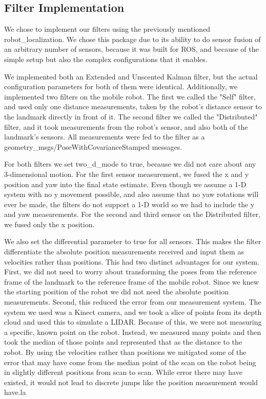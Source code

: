 \documentclass[conference]{IEEEtran}
\begin{document}
\subsection{Filter Implementation}
We chose to implement our filters using the previously mentioned robot\_localization. We chose this package due to its 
ability to do sensor fusion of an arbitrary number of sensors, because it was built for ROS, and because of the simple 
setup but also the complex configurations that it enables.

We implemented both an Extended and Unscented Kalman filter, but the actual configuration parameters for both of them 
were identical. Additionally, we implemented two filters on the mobile robot. The first we called the "Self" filter, 
and used only one distance measurements, taken by the robot's distance sensor to the landmark directly in front of it. 
The second filter we called the "Distributed" filter, and it took measurements from the robot's sensor, and also both 
of the landmark's sensors. All measurements were fed to the filter as a geometry\_msgs/PoseWithCovarianceStamped 
messages.

For both filters we set two\_d\_mode to true, because we did not care about any 3-dimensional motion. For the first 
sensor measurement, we fused the x and y position and yaw into the final state estimate. Even though we assume a 1-D 
system with no y movement possible, and also assume that no yaw rotations will ever be made, the filters do not support 
a 1-D world so we had to include the y and yaw measurements. For the second and third sensor on the Distributed filter, 
we fused only the x position.

We also set the differential parameter to true for all sensors. This makes the filter differentiate the absolute 
position measurements received and input them as velocities rather than positions. This had two distinct advantages for 
our system. First, we did not need to worry about transforming the poses from the reference frame of the landmark to 
the reference frame of the mobile robot. Since we knew the starting position of the robot we did not need the absolute 
position measurements. Second, this reduced the error from our measurement system. The system we used was a Kinect 
camera, and we took a slice of points from its depth cloud and used this to simulate a LIDAR. Because of this, we were 
not measuring a specific, known point on the robot. Instead, we measured many points and then took the median of those 
points and represented that as the distance to the robot. By using the velocities rather than positions we mitigated 
some of the error that may have come from the median point of the scan on the robot being in slightly different 
positions from scan to scan. While error there may have existed, it would not lead to discrete jumps like the position 
measurement would have.la
\end{document}
